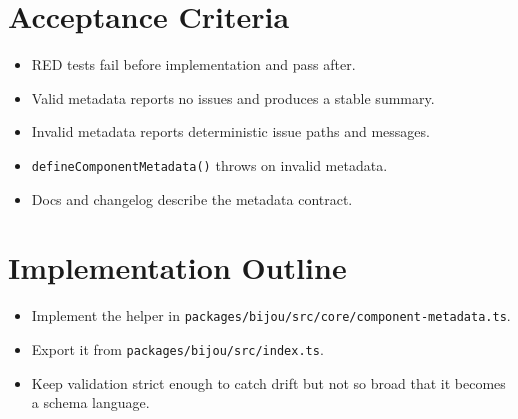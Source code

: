 \section{Acceptance Criteria}\label{record-125-acceptance-criteria}

\begin{itemize}
\tightlist
\item
  RED tests fail before implementation and pass after.
\item
  Valid metadata reports no issues and produces a stable summary.
\item
  Invalid metadata reports deterministic issue paths and messages.
\item
  \texttt{d\allowbreak{}e\allowbreak{}f\allowbreak{}i\allowbreak{}n\allowbreak{}e\allowbreak{}C\allowbreak{}o\allowbreak{}m\allowbreak{}p\allowbreak{}o\allowbreak{}n\allowbreak{}e\allowbreak{}n\allowbreak{}t\allowbreak{}M\allowbreak{}e\allowbreak{}t\allowbreak{}a\allowbreak{}d\allowbreak{}a\allowbreak{}t\allowbreak{}a\allowbreak{}(\allowbreak{})} throws on invalid metadata.
\item
  Docs and changelog describe the metadata contract.
\end{itemize}

\section{Implementation Outline}\label{record-125-implementation-outline}

\begin{itemize}
\tightlist
\item
  Implement the helper in \texttt{p\allowbreak{}a\allowbreak{}c\allowbreak{}k\allowbreak{}a\allowbreak{}g\allowbreak{}e\allowbreak{}s\allowbreak{}/\allowbreak{}b\allowbreak{}i\allowbreak{}j\allowbreak{}o\allowbreak{}u\allowbreak{}/\allowbreak{}s\allowbreak{}r\allowbreak{}c\allowbreak{}/\allowbreak{}c\allowbreak{}o\allowbreak{}r\allowbreak{}e\allowbreak{}/\allowbreak{}c\allowbreak{}o\allowbreak{}m\allowbreak{}p\allowbreak{}o\allowbreak{}n\allowbreak{}e\allowbreak{}n\allowbreak{}t\allowbreak{}-\allowbreak{}m\allowbreak{}e\allowbreak{}t\allowbreak{}a\allowbreak{}d\allowbreak{}a\allowbreak{}t\allowbreak{}a\allowbreak{}.\allowbreak{}t\allowbreak{}s}.
\item
  Export it from \texttt{p\allowbreak{}a\allowbreak{}c\allowbreak{}k\allowbreak{}a\allowbreak{}g\allowbreak{}e\allowbreak{}s\allowbreak{}/\allowbreak{}b\allowbreak{}i\allowbreak{}j\allowbreak{}o\allowbreak{}u\allowbreak{}/\allowbreak{}s\allowbreak{}r\allowbreak{}c\allowbreak{}/\allowbreak{}i\allowbreak{}n\allowbreak{}d\allowbreak{}e\allowbreak{}x\allowbreak{}.\allowbreak{}t\allowbreak{}s}.
\item
  Keep validation strict enough to catch drift but not so broad that it becomes a schema language.
\end{itemize}

